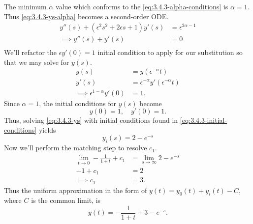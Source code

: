 \documentclass[12pt,twoside]{article}
\begin{document}
The minimum $\alpha$ value which conforms to the
\cref{eq:3.4.3-alpha-conditions} is $\alpha=1$. Thus \cref{eq:3.4.3-ys-alpha}
becomes a second-order ODE.\@
\begin{equation}
  \label{eq:3.4.3-ys}
  \begin{aligned}
    y''(s) + (\epsilon^{2}s^{2}+2\epsilon s+1)y'(s) &= \epsilon^{2\alpha-1} \\
    \implies y''(s) + y'(s) &= 0 \\
  \end{aligned}
\end{equation}
We'll refactor the $\epsilon y'(0)=1$ initial condition to apply for our
substitution so that we may solve for $y(s)$.
\begin{equation*}
  \begin{aligned}
    y(s) &= y(\epsilon^{-\alpha}t) \\
    y'(s) &= \epsilon^{-\alpha}y'(\epsilon^{-\alpha}t) \\
    \implies \epsilon^{1-\alpha}y'(0) &= 1.
  \end{aligned}
\end{equation*}
Since $\alpha=1$, the initial conditions for $y(s)$ become
\begin{equation}
  \label{eq:3.4.3-initial-conditions}
  y(0) = 1,\quad y'(0) = 1.
\end{equation}
Thus, solving \cref{eq:3.4.3-ys} with initial conditions found in
\cref{eq:3.4.3-initial-conditions} yields
\begin{equation*}
  \boxed{y_i(s) = 2-e^{-s}}
\end{equation*}
Now we'll perform the matching step to resolve $c_1$.
\begin{equation*}
  \begin{aligned}
    \lim_{t\rightarrow0}-\frac{1}{1+t}+c_1 &= \lim_{s\rightarrow\infty}2-e^{-s} \\
    -1+c_1 &= 2 \\
    \implies c_1 &= 3.
  \end{aligned}
\end{equation*}
Thus the uniform approximation in the form of $y(t)=y_0(t)+y_i(t)-C$, where $C$
is the common limit, is
\begin{equation*}
  \boxed{y(t)=-\frac{1}{1+t}+3-e^{-s}.}
\end{equation*}
\end{document}
